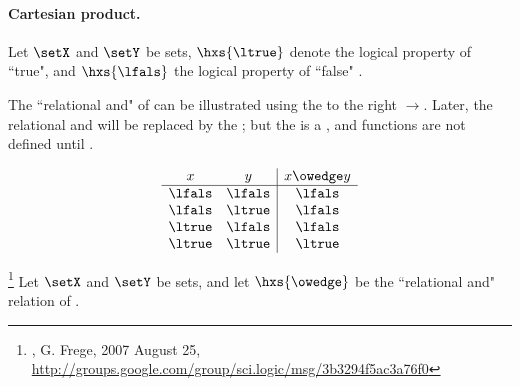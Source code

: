\paragraph{Cartesian product.}
\begin{definition}
\label{def:rel_and}
Let $\setX$ and $\setY$ be sets, $\hxs{\ltrue}$ denote the logical property of ``true", 
and $\hxs{\lfals}$ the logical property of ``false" .
\end{definition}


\begin{minipage}{3\tw/4}
  The ``relational and" of  can be illustrated
  using the  to the right $\rightarrow$.
  Later, the relational and will be replaced by the ;
  but the  is a , and functions are not defined
  until .
\end{minipage}%
\begin{minipage}{\tw/4}
  \[\begin{array}[t]{cc|c}
      x & y & x\owedge y  \\
      \hline
      \lfals & \lfals & \lfals \\
      \lfals & \ltrue & \lfals \\
      \ltrue & \lfals & \lfals \\
      \ltrue & \ltrue & \ltrue
    \end{array}\]
\end{minipage}

\begin{definition}
\label{def:AxB}
\footnote{
  ,
  G. Frege, 2007 August 25, \url{http://groups.google.com/group/sci.logic/msg/3b3294f5ac3a76f0}
  }
Let $\setX$ and $\setY$ be sets, and
let $\hxs{\owedge}$ be the ``relational and" relation of .
\end{definition}




